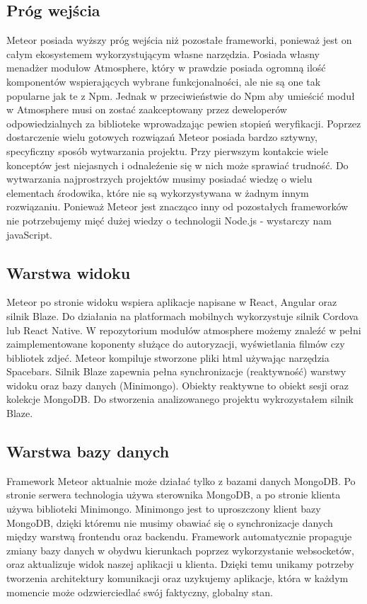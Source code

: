 \documentclass[12pt]{report}
\begin{document}
    \subsection{Próg wejścia}
      Meteor posiada wyższy próg wejścia niż pozostałe frameworki, ponieważ jest on całym ekosystemem wykorzystującym własne narzędzia.
      Posiada własny menadżer modułow Atmosphere, który w prawdzie posiada ogromną ilość komponentów wspierających wybrane funkcjonalności, ale nie są one tak popularne jak te z Npm.
      Jednak w przeciwieństwie do Npm aby umieścić moduł w Atmosphere musi on zostać zaakceptowany przez deweloperów odpowiedzialnych za biblioteke wprowadzając pewien stopień weryfikacji.
      Poprzez dostarczenie wielu gotowych rozwiązań Meteor posiada bardzo sztywny, specyficzny sposób wytwarzania projektu.
      Przy pierwszym kontakcie wiele konceptów jest niejasnych i odnaleźenie się w nich może sprawiać trudność. 
      Do wytwarzania najprostrzych projektów musimy posiadać wiedzę o wielu elementach środowika, które nie są wykorzystywana w żadnym innym rozwiązaniu.
      Ponieważ Meteor jest znacząco inny od pozostałych frameworków nie potrzebujemy mięć dużej wiedzy o technologii Node.js - wystarczy nam javaScript.

    \subsection{Warstwa widoku}
      Meteor po stronie widoku wspiera aplikacje napisane w React, Angular oraz silnik Blaze.
      Do działania na platformach mobilnych wykorzystuje silnik Cordova lub React Native.
      W repozytorium modułów atmosphere możemy znaleźć w pełni zaimplementowane koponenty służące do autoryzacji, wyświetlania filmów czy bibliotek zdjeć.
      Meteor kompiluje stworzone pliki html używając narzędzia Spacebars.
      Silnik Blaze zapewnia pełna synchronizacje (reaktywność) warstwy widoku oraz bazy danych (Minimongo).
      Obiekty reaktywne to obiekt sesji oraz kolekcje MongoDB.
      Do stworzenia analizowanego projektu wykrozystałem silnik Blaze.

    \subsection{Warstwa bazy danych}
      Framework Meteor aktualnie może działać tylko z bazami danych MongoDB.
      Po stronie serwera technologia używa sterownika MongoDB, a po stronie klienta używa biblioteki Minimongo.
      Minimongo jest to uproszczony klient bazy MongoDB, dzięki któremu nie musimy obawiać się o synchronizacje danych między warstwą frontendu oraz backendu.
      Framework automatycznie propaguje zmiany bazy danych w obydwu kierunkach poprzez wykorzystanie websocketów, oraz aktualizuje widok naszej aplikacji u klienta.
      Dzięki temu unikamy potrzeby tworzenia architektury komunikacji oraz uzykujemy aplikacje, która w każdym momencie może odzwierciedlać swój faktyczny, globalny stan.
    
\end{document}
